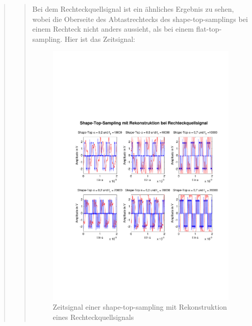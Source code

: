 \begin{quote}
\begin{quote}
        
        	Bei dem Rechteckquellsignal ist ein ähnliches Ergebnis zu sehen, wobei die
        	Oberseite des Abtastrechtecks des shape-top-samplings bei einem Rechteck
        	nicht anders aussieht, als bei einem flat-top-sampling. Hier ist das
        	Zeitsignal:
        	   	
        	\begin{figure}[H]
            \centering
            \includegraphics[scale=0.6, trim = 1.5cm 6cm 1cm 8cm,
            clip]{./Bilder/shape-top-recht}
                \caption{Zeitsignal einer shape-top-sampling mit Rekonstruktion
                eines Rechteckquellsignals}
      	    \end{figure}
      	    

\end{quote}
\end{quote}
